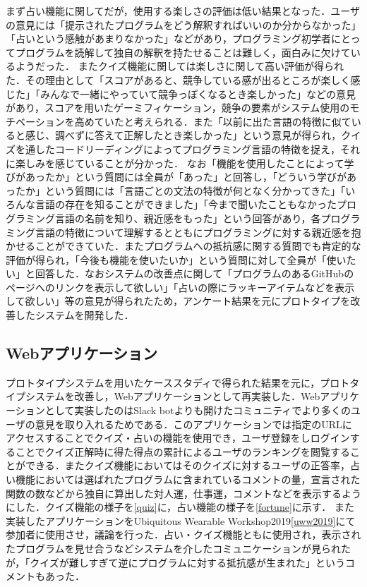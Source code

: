 まず占い機能に関してだが，使用する楽しさの評価は低い結果となった．ユーザの意見には「提示されたプログラムをどう解釈すればいいのか分からなかった」「占いという感触があまりなかった」などがあり，プログラミング初学者にとってプログラムを読解して独自の解釈を持たせることは難しく，面白みに欠けているようだった．
またクイズ機能に関しては楽しさに関して高い評価が得られた．その理由として「スコアがあると、競争している感が出るところが楽しく感じた」「みんなで一緒にやっていて競争っぽくなるとき楽しかった」などの意見があり，スコアを用いたゲーミフィケーション，競争の要素がシステム使用のモチベーションを高めていたと考えられる．また「以前に出た言語の特徴に似ていると感じ、調べずに答えて正解したとき楽しかった」という意見が得られ，クイズを通したコードリーディングによってプログラミング言語の特徴を捉え，それに楽しみを感じていることが分かった．
なお「機能を使用したことによって学びがあったか」という質問には全員が「あった」と回答し，「どういう学びがあったか」という質問には「言語ごとの文法の特徴が何となく分かってきた」「いろんな言語の存在を知ることができました」「今まで聞いたこともなかったプログラミング言語の名前を知り、親近感をもった」という回答があり，各プログラミング言語の特徴について理解するとともにプログラミングに対する親近感を抱かせることができていた．またプログラムへの抵抗感に関する質問でも肯定的な評価が得られ，「今後も機能を使いたいか」という質問に対して全員が「使いたい」と回答した．なおシステムの改善点に関して「プログラムのあるGitHubのページへのリンクを表示して欲しい」「占いの際にラッキーアイテムなどを表示して欲しい」等の意見が得られたため，アンケート結果を元にプロトタイプを改善したシステムを開発した．

\subsection{Webアプリケーション}
プロトタイプシステムを用いたケーススタディで得られた結果を元に，プロトタイプシステムを改善し，Webアプリケーションとして再実装した．Webアプリケーションとして実装したのはSlack botよりも開けたコミュニティでより多くのユーザの意見を取り入れるためである．このアプリケーションでは指定のURLにアクセスすることでクイズ・占いの機能を使用でき，ユーザ登録をしログインすることでクイズ正解時に得た得点の累計によるユーザのランキングを閲覧することができる．またクイズ機能においてはそのクイズに対するユーザの正答率，占い機能においては選ばれたプログラムに含まれているコメントの量，宣言された関数の数などから独自に算出した対人運，仕事運，コメントなどを表示するようにした．クイズ機能の様子を\ref{quiz}に，占い機能の様子を\ref{fortune}に示す．
また実装したアプリケーションをUbiquitous Wearable Workshop2019\ref{uww2019}にて参加者に使用させ，議論を行った．占い・クイズ機能ともに使用され，表示されたプログラムを見せ合うなどシステムを介したコミュニケーションが見られたが，「クイズが難しすぎて逆にプログラムに対する抵抗感が生まれた」というコメントもあった．

